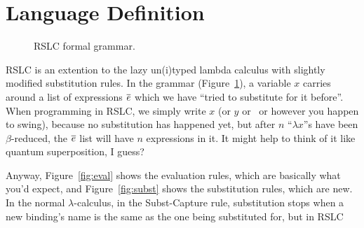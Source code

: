 \documentclass[10pt]{sigplanconf}
\begin{document}
\section{Language Definition}

\begin{figure}[t]
	\Grammar
	\caption{RSLC formal grammar.}
	\label{fig:grammar}
\end{figure}

RSLC is an extention to the lazy un(i)typed lambda calculus with slightly modified substitution rules. In the grammar (Figure~\ref{fig:grammar}), a variable $x$ carries around a list of expressions $\overline{e}$ which we have ``tried to substitute for it before''.
When programming in RSLC, we simply write $x$ (or $y$ or \Neptune~or however you happen to swing), because no substitution has happened yet, but after $n$ ``$\lambda x$''s have been $\beta$-reduced, the $\overline{e}$ list will have $n$ expressions in it.
It might help to think of it like quantum superposition, I guess?

Anyway, Figure~\ref{fig:eval} shows the evaluation rules, which are basically what you'd expect, and Figure~\ref{fig:subst} shows the substitution rules, which are new.
In the normal $\lambda$-calculus, in the {\sc Subst-Capture} rule, substitution stops when a new binding's name is the same as the one being substituted for, but in RSLC 




\end{document}
